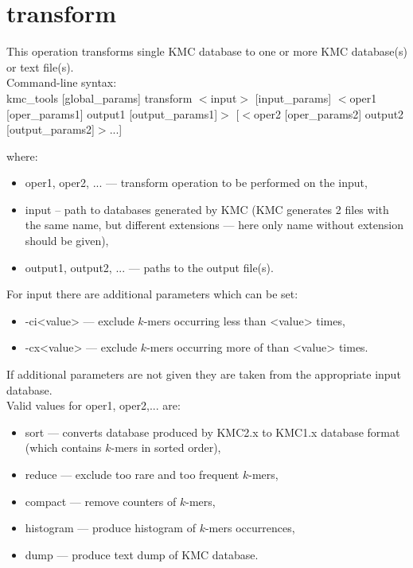 \clearpage
\section{transform}
\label{sec:transform}

This operation transforms single \textsf{KMC} database to one or more \textsf{KMC} database(s) or text file(s). \\
Command-line syntax: \\
kmc\_tools [global\_params] transform $<$input$>$ [input\_params] $<$oper1 [oper\_params1] output1 [output\_params1]$>$ [$<$oper2 [oper\_params2] output2 [output\_params2]$>$...]

where:


\begin{itemize}
	\item \textsf{oper1, oper2, ...} --- transform operation to be performed on the input,
	\item \textsf{input} -- path to databases generated by \textsf{KMC} (\textsf{KMC} generates 2 files with the same name, but different extensions --- here only name without extension should be given),
	\item \textsf{output1, output2, ...} --- paths to the output file(s).
\end{itemize}

For input there are additional parameters which can be set:
\begin{itemize}
	\item \textsf{-ci<value>} --- exclude $k$-mers occurring less than <value> times,
	\item \textsf{-cx<value>} --- exclude $k$-mers occurring more of than <value> times.
\end{itemize}

If additional parameters are not given they are taken from the appropriate input database. \\

Valid values for oper1, oper2,... are:
\begin{itemize}
	\item \textsf{sort} --- converts database produced by KMC2.x to KMC1.x database format (which contains $k$-mers in sorted order),
	\item \textsf{reduce} --- exclude too rare and too frequent $k$-mers,
	\item \textsf{compact} --- remove counters of $k$-mers,
	\item \textsf{histogram} --- produce histogram of $k$-mers occurrences,
	\item \textsf{dump} --- produce text dump of \textsf{KMC} database.	
\end{itemize}

